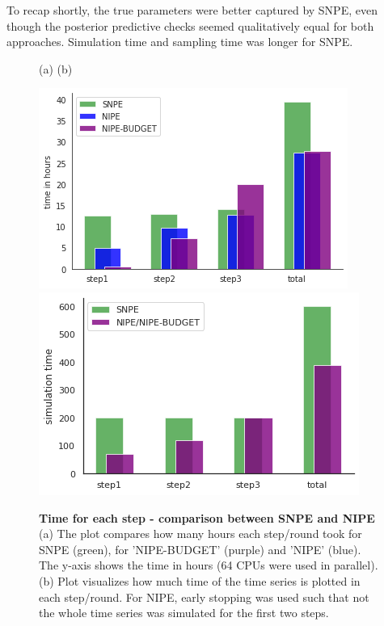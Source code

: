\documentclass[12pt]{extreport}
\begin{document}
To recap shortly, the true parameters were better captured by SNPE, even though the posterior predictive checks seemed qualitatively equal for both approaches. Simulation time and sampling time was longer for SNPE. 

 \begin{figure}

    \begin{minipage}{13cm}
        \small (a)  \hspace{6cm} \small (b)
    \end{minipage}
     \centering
        \includegraphics[width=0.41\linewidth]{images/thesis_fig4_9_time.png}
        \includegraphics[width=0.41\linewidth]{images/thesis_fig4_9_simtime.png}



\caption{\label{time}\textbf{Time for each step - comparison between SNPE and NIPE} \small (a) The plot compares how many hours each step/round took for SNPE (green), for 'NIPE-BUDGET' (purple) and 'NIPE' (blue). The y-axis shows the time in hours (64 CPUs were used in parallel). (b) Plot visualizes how much time of the time series is plotted in each step/round. For NIPE, early stopping was used such that not the whole time series was simulated for the first two steps.}

\end{figure}
\end{document}
